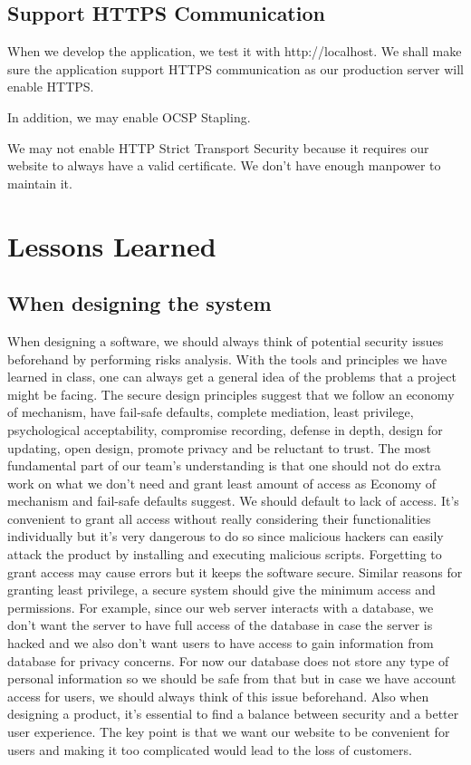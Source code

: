 \documentclass[12pt, a4paper]{article}
\begin{document}
\subsection{Support HTTPS Communication}
When we develop the application, we test it with http://localhost. We shall make sure the application support HTTPS communication as our production server will enable HTTPS. 

In addition, we may enable OCSP Stapling. %

We may not enable HTTP Strict Transport Security because it requires our website to always have a valid certificate. We don't have enough manpower to maintain it.

\section{Lessons Learned}
\subsection{When designing the system}
When designing a software, we should always think of potential security issues beforehand by performing risks analysis. With the tools and principles we have learned in class, one can always get a general idea of the problems that a project might be facing. The secure design principles suggest that we follow an economy of mechanism, have fail-safe defaults, complete mediation, least privilege, psychological acceptability, compromise recording, defense in depth, design for updating, open design, promote privacy and be reluctant to trust. The most fundamental part of our team's understanding is that one should not do extra work on what we don’t need and grant least amount of access as Economy of mechanism and fail-safe defaults suggest. We should default to lack of access. It’s convenient to grant all access without really considering their functionalities individually but it’s very dangerous to do so since malicious hackers can easily attack the product by installing and executing malicious scripts. Forgetting to grant access may cause errors but it keeps the software secure. Similar reasons for granting least privilege, a secure system should give the minimum access and permissions. For example, since our web server interacts with a database, we don’t want the server to have full access of the database in case the server is hacked and we also don’t want users to have access to gain information from database for privacy concerns. For now our database does not store any type of personal information so we should be safe from that but in case we have account access for users, we should always think of this issue beforehand. Also when designing a product, it’s essential to find a balance between security and a better user experience. The key point is that we want our website to be convenient for users and making it too complicated would lead to the loss of customers.
\end{document}
